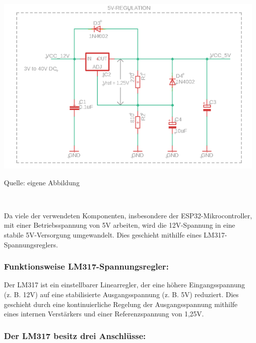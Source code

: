 \documentclass[ngerman,12pt,a4paper]{article}
\begin{document}
			\begin{center} 
				\begin{minipage}[t]{0.7\textwidth}
					\includegraphics[scale=0.7]{Pictures/spannungswandler}
					\label{fig: spannungswandler}
					\vspace{-10pt}
					\begin{center}
						\par\small Quelle: eigene Abbildung
					\end{center}
				\end{minipage} \\[0.75cm]
			\end{center}
		Da viele der verwendeten Komponenten, insbesondere der ESP32-Mikrocontroller, mit einer Betriebsspannung von 5V arbeiten, wird die 12V-Spannung in eine stabile 5V-Versorgung umgewandelt. Dies geschieht mithilfe eines LM317-Spannungsreglers.
		
		\subsubsection*{Funktionsweise LM317-Spannungsregler:}
		
		Der LM317 ist ein einstellbarer Linearregler, der eine höhere Eingangsspannung (z. B. 12V) auf eine stabilisierte Ausgangsspannung (z. B. 5V) reduziert. Dies geschieht durch eine kontinuierliche Regelung der Ausgangsspannung mithilfe eines internen Verstärkers und einer Referenzspannung von 1,25V.
		
		\subsubsection*{Der LM317 besitz drei Anschlüsse: }
		
\end{document}

